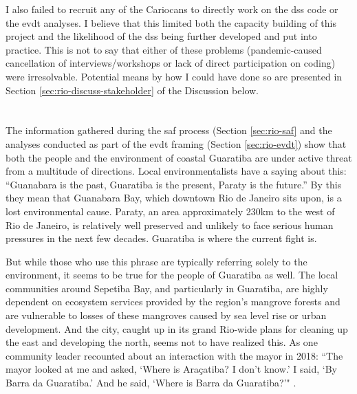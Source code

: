 I also failed to recruit any of the Cariocans to directly work on the \ac{dss} code or the \ac{evdt} analyses. I believe that this limited both the capacity building of this project and the likelihood of the \ac{dss} being further developed and put into practice. This is not to say that either of these problems (pandemic-caused cancellation of interviews/workshops or lack of direct participation on coding) were irresolvable. Potential means by how I could have done so are presented in Section \ref{sec:rio-discuss-stakeholder} of the Discussion below.

\section{} \label{sec:rio-discussion}



\subsection{} 

The information gathered during the \ac{saf} process (Section \ref{sec:rio-saf} and the analyses conducted as part of the \ac{evdt} framing (Section \ref{sec:rio-evdt}) show that both the people and the environment of coastal Guaratiba are under active threat from a multitude of directions. Local environmentalists have a saying about this: “Guanabara is the past, Guaratiba is the present, Paraty is the future.” By this they mean that Guanabara Bay, which downtown Rio de Janeiro sits upon, is a lost environmental cause. Paraty, an area approximately 230km to the west of Rio de Janeiro, is relatively well preserved and unlikely to face serious human pressures in the next few decades. Guaratiba is where the current fight is. 

But while those who use this phrase are typically referring solely to the environment, it seems to be true for the people of Guaratiba as well. The local communities around Sepetiba Bay, and particularly in Guaratiba, are highly dependent on ecosystem services provided by the region's mangrove forests and are vulnerable to losses of these mangroves caused by sea level rise or urban development.  And the city, caught up in its grand Rio-wide plans for cleaning up the east and developing the north, seems not to have realized this. As one community leader recounted about an interaction with the mayor in 2018: ``The mayor looked at me and asked, `Where is Araçatiba? I don’t know.’ I said, `By Barra da Guaratiba.’ And he said, `Where is Barra da Guaratiba?'" \cite{stroblFollowingRecentEviction2018}. 


